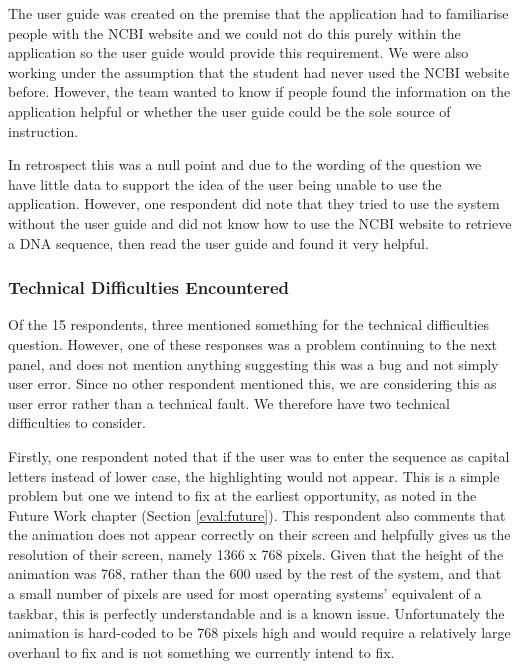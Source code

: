 The user guide was created on the premise that the application had to
familiarise people with the NCBI website \cite{ncbi} and we could not
do this purely within the application so the user guide would provide
this requirement.
We were also working under the assumption that the student had never
used the NCBI website \cite{ncbi} before.
However, the team wanted to know if people found the information on the
application helpful or whether the user guide could be the sole source
of instruction.

In retrospect this was a null point and due to the wording of the
question we have little data to support the idea of the user being
unable to use the application.
However, one respondent did note that they tried to use the system
without the user guide and did not know how to use the NCBI website
\cite{ncbi} to retrieve a DNA sequence, then read the user guide and
found it very helpful. 

\subsubsection{Technical Difficulties Encountered}

Of the 15 respondents, three mentioned something for the technical
difficulties question.
However, one of these responses was a problem continuing to the next
panel, and does not mention anything suggesting this was a bug and not
simply user error.
Since no other respondent mentioned this, we are considering this as
user error rather than a technical fault.
We therefore have two technical difficulties to consider.

Firstly, one respondent noted that if the user was to enter the
sequence as capital letters instead of lower case, the highlighting
would not appear.
This is a simple problem but one we intend to fix at the earliest
opportunity, as noted in the Future Work chapter (Section
\ref{eval:future}).
This respondent also comments that the animation does not appear
correctly on their screen and helpfully gives us the resolution of
their screen, namely 1366 x 768 pixels.
Given that the height of the animation was 768, rather than the 600
used by the rest of the system, and that a small number of pixels are
used for most operating systems' equivalent of a taskbar, this is
perfectly understandable and is a known issue.
Unfortunately the animation is hard-coded to be 768 pixels high and
would require a relatively large overhaul to fix and is not something we
currently intend to fix.

